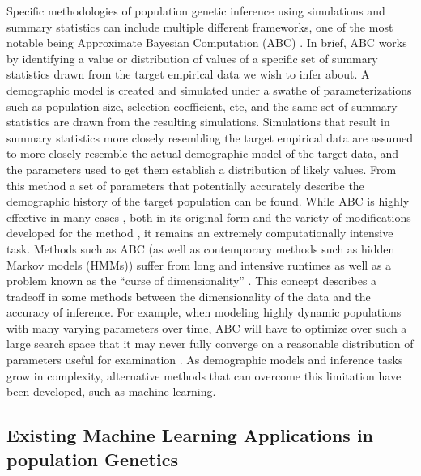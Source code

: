 Specific methodologies of population genetic inference using simulations and summary statistics can include multiple different frameworks, one of the most notable being Approximate Bayesian Computation (ABC) \cite{beaumontApproximateBayesianComputation2002}. In brief, ABC works by identifying a value or distribution of values of a specific set of summary statistics drawn from the target empirical data we wish to infer about. A demographic model is created and simulated under a swathe of parameterizations such as population size, selection coefficient, etc, and the same set of summary statistics are drawn from the resulting simulations. Simulations that result in summary statistics more closely resembling the target empirical data are assumed to more closely resemble the actual demographic model of the target data, and the parameters used to get them establish a distribution of likely values. From this method a set of parameters that potentially accurately describe the demographic history of the target population can be found. While ABC is highly effective in many cases , both in its original form \cite{beaumontApproximateBayesianComputation2002} and the variety of modifications developed for the method \cite{follWFABCWrightFisher2015, pudloReliableABCModel2016, ferrer-admetllaApproximateMarkovModel2016, raynalABCRandomForests2019}, it remains an extremely computationally intensive task. Methods such as ABC (as well as contemporary methods such as hidden Markov models (HMMs)) suffer from long and intensive runtimes as well as a problem known as the “curse of dimensionality” . This concept describes a tradeoff in some methods between the dimensionality of the data and the accuracy of inference. For example, when modeling highly dynamic populations with many varying parameters over time, ABC will have to optimize over such a large search space that it may never fully converge on a reasonable distribution of parameters useful for examination \cite{beaumontApproximateBayesianComputation2002}. As demographic models and inference tasks grow in complexity, alternative methods that can overcome this limitation have been developed, such as machine learning.


\subsection{Existing Machine Learning Applications in population Genetics}

